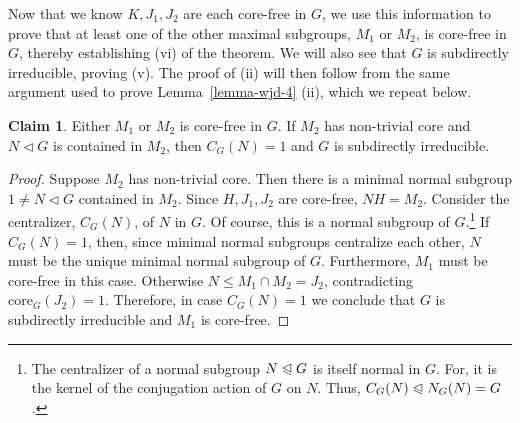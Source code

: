 \documentclass[cm,dissertation]{uhthesis}
\theoremstyle{plain}
\theoremstyle{definition}
\newcounter{claim}
\newtheorem{claim}[claim]{Claim}
\theoremstyle{remark}
\numberwithin{theorem}{section}
\numberwithin{claim}{chapter}
\numberwithin{equation}{section}
\numberwithin{conjecture}{chapter}
\newcommand{\<}{\ensuremath{\langle}}
\renewcommand{\>}{\ensuremath{\rangle}}
\renewcommand{\leq}{\ensuremath{\leqslant}}
\newcommand{\ssubnormal}{\ensuremath{\vartriangleleft}}
\newcommand{\subnormal}{\ensuremath{\trianglelefteqslant}}
\newcommand{\core}{\ensuremath{\mathrm{core}}}
\newcommand{\0}{\ensuremath{\mathbf{0}}}
\newcommand{\1}{\ensuremath{\mathbf{1}}}
\newcommand{\2}{\ensuremath{\mathbf{2}}}
\newcommand{\3}{\ensuremath{\mathbf{3}}}
\newcommand{\4}{\ensuremath{\mathbf{4}}}
\newcommand{\5}{\ensuremath{\mathbf{5}}}
\begin{document}
Now that we know $K, J_1, J_2$ are each core-free in $G$, we use this
information to prove that at least one of the other maximal subgroups, 
$M_1$ or $M_2$, is core-free in $G$, thereby establishing (vi) of the theorem.  
We will also see that $G$ is subdirectly irreducible, proving (v).  The proof of
(ii) will then follow from the same argument used to prove 
Lemma~\ref{lemma-wjd-4} (ii), which we repeat below.

\begin{claim}
  Either $M_1$ or $M_2$ is core-free in $G$.  If $M_2$ has non-trivial core
  and $N\ssubnormal G$ is contained in $M_2$, then
  $C_G(N)=1$ and $G$ is subdirectly irreducible.
\end{claim}
\begin{proof}
  Suppose $M_2$ has non-trivial core.  Then there is 
a minimal normal subgroup $1\neq N \ssubnormal G$ 
  contained in $M_2$. %
  Since $H, J_1, J_2$ are core-free, $NH=M_2$.  Consider the centralizer,
  $C_G(N)$, of $N$ in $G$.  Of course, this is a normal subgroup 
  of $G$.\footnote{The centralizer of a normal subgroup $N\subnormal G$ is itself
    normal in $G$.  For, it is the kernel of the conjugation action of $G$ on
    $N$. Thus, $C_G(N) \subnormal N_G(N) = G$.} 
If $C_G(N) = 1$, then, since minimal normal subgroups
  centralize each other, $N$ must be the unique minimal normal subgroup of $G$.
  Furthermore, $M_1$ must be core-free in this case.  Otherwise 
  $N\leq M_1 \cap M_2 = J_2$, contradicting $\core_G(J_2)=1$. 
  Therefore, in case $C_G(N) = 1$ we 
  conclude that $G$ is subdirectly irreducible and $M_1$ is core-free.


\end{proof}
\end{document}
